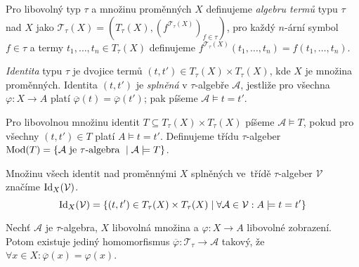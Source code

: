 \begin{example}
\end{example}

\begin{definition}
Pro libovolný typ $\tau$ a množinu proměnných $X$ definujeme
{\em algebru termů} typu $\tau$ nad $X$ jako
$\mathcal{T}_\tau(X) = (T_\tau(X), (f^{\mathcal{T}_\tau(X)})_{f \in \tau})$,
pro každý $n$-ární symbol $f \in \tau$ a termy
$t_1, \ldots, t_n \in T_\tau(X)$ definujeme
\linebreak
$f^{\mathcal{T}_\tau(X)}(t_1, \ldots, t_n) = f(t_1, \ldots, t_n)$.
\end{definition}


\begin{definition}
    {\em Identita} typu $\tau$ je dvojice termů
    $(t, t') \in T_\tau(X) \times T_\tau(X)$,
    kde $X$ je množina proměnných.
    Identita $(t, t')$ je {\em splněná} v $\tau$-algebře $\mathcal{A}$,
    jestliže pro všechna $\varphi : X \to A$
    platí $\overline{\varphi}(t) = \overline{\varphi}(t')$; pak píšeme
    $\mathcal{A} \models t = t'$.
\end{definition}

\begin{definition}
    Pro libovolnou množinu identit
    $T \subseteq T_\tau(X) \times T_\tau(X)$
    píšeme $\mathcal{A} \models T$, pokud
    pro všechny $(t, t') \in T$ platí $A \models t = t'$.
    Definujeme třídu $\tau$-algeber
    $\operatorname{Mod}(T) = \{\mathcal{A} \text{ je $ \tau$-algebra } \mid
    \mathcal{A} \models T \}$.
\end{definition}

\begin{definition}[$\Id$]
    Množinu všech identit nad proměnnými $X$ splněných \linebreak ve~třídě
    $\tau$-algeber $\mathcal{V}$ značíme $\operatorname{Id}_X(\mathcal{V})$.
    \[
        \operatorname{Id}_X(\mathcal{V})
        = \{ (t, t') \in T_\tau(X) \times T_\tau(X)
            \mid \forall \mathcal{A} \in \mathcal{V}
            : A \models t = t' \}
    \]
\end{definition}


\begin{theorem}
Nechť $\mathcal{A}$ je $\tau$-algebra,
$X$ libovolná množina a $\varphi : X \to A$ libovolné zobrazení.
Potom existuje jediný homomorfismus
$\overline{\varphi} : \mathcal{T}_\tau \to \mathcal{A}$ takový,
že \linebreak $\forall x \in X : \overline{\varphi}(x) = \varphi(x)$.

\center
{}

\end{theorem}

